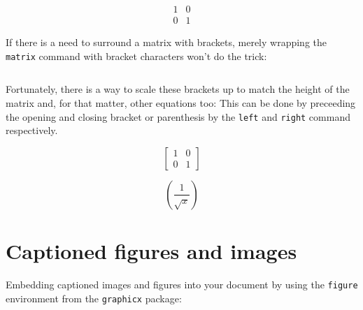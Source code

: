 \documentclass{article}
\begin{document}
\begin{equation*}
    \begin{matrix}
        1 & 0 \\
        0 & 1
    \end{matrix}
\end{equation*}

If there is a need to surround a matrix with brackets, merely wrapping the
\texttt{matrix} command with bracket characters won't do the trick:

\begin{equation*}
    [
        \begin{matrix}
            1 & 0 \\
            0 & 1
        \end{matrix}
    ]
\end{equation*}

Fortunately, there is a way to scale these brackets up to match the height of
the matrix and, for that matter, other equations too:
This can be done by preceeding the opening and closing bracket or parenthesis by
the \texttt{left} and \texttt{right} command respectively.

\begin{equation*}
    \left[
        \begin{matrix}
            1 & 0 \\
            0 & 1
        \end{matrix}
    \right]
\end{equation*}

\begin{equation*}
    \left(\frac{1}{\sqrt{x}}\right)
\end{equation*}

\newpage
\section{Captioned figures and images}

Embedding captioned images and figures into your document by using the
\texttt{figure} environment from the \texttt{graphicx} package:

%
\end{document}
